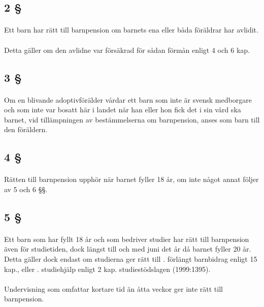 \documentclass[a4paper,notitlepage,openany,10pt]{book}
\begin{document}
\subsection*{2 §}
\paragraph*{}
Ett barn har rätt till barnpension om barnets ena eller båda föräldrar har avlidit.
\paragraph*{}
Detta gäller om den avlidne var försäkrad för sådan förmån enligt 4 och 6 kap.
\subsection*{3 §}
\paragraph*{}
Om en blivande adoptivförälder vårdar ett barn som inte är svensk medborgare och som inte var bosatt här i landet när han eller hon fick det i sin vård ska barnet, vid tillämpningen av bestämmelserna om barnpension, anses som barn till den föräldern.
\subsection*{4 §}
\paragraph*{}
Rätten till barnpension upphör när barnet fyller 18 år, om inte något annat följer av 5 och 6 §§.
\subsection*{5 §}
\paragraph*{}
Ett barn som har fyllt 18 år och som bedriver studier har rätt till barnpension även för studietiden, dock längst till och med juni det år då barnet fyller 20 år. Detta gäller dock endast om studierna ger rätt till
. förlängt barnbidrag enligt 15 kap., eller
. studiehjälp enligt 2 kap. studiestödslagen (1999:1395).
\paragraph*{}
Undervisning som omfattar kortare tid än åtta veckor ger inte rätt till barnpension.
\end{document}
